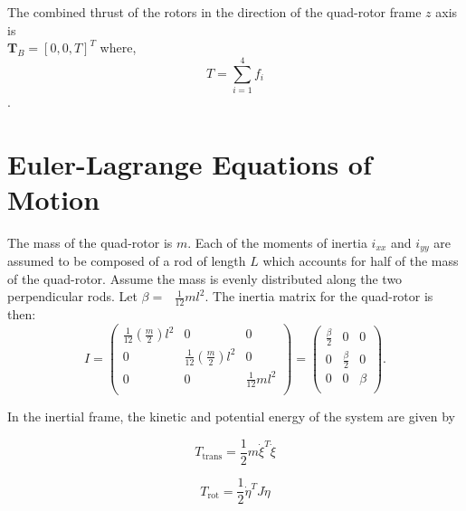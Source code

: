 The combined thrust of the rotors in the direction of the quad-rotor frame $z$ axis is\\

$\boldsymbol T_B = [0, 0, T]^T$ where,\\

\begin{equation}
    \label{totalThrust}
    T =  \displaystyle \sum \limits_{i=1}^4 f_i
\end{equation}.



\section{Euler-Lagrange Equations of Motion}


\noindent 
The mass of the quad-rotor is $m$. Each of the moments of inertia  $ i_{xx} $  and $ i_{yy} $
are assumed to be composed of a rod of length $ L $   which accounts for half of the mass of the quad-rotor. Assume the mass
is evenly distributed along the two perpendicular rods. Let  \(\beta  =\text{  }\frac{1}{12}m l^2 \). The inertia matrix for the quad-rotor is then: \\

\begin{equation}
I = \left(
\begin{array}{ccc}
 \frac{1}{12}\left(\frac{m}{2}\right)l^2 & 0 & 0 \\
 0 & \frac{1}{12}\left(\frac{m}{2}\right)l^2 & 0 \\
 0 & 0 & \frac{1}{12}m l^2 \\
\end{array}
\right) = \left(
\begin{array}{ccc}
 \frac{\beta }{2} & 0 & 0 \\
 0 & \frac{\beta }{2} & 0 \\
 0 & 0 & \beta  \\
\end{array}
\right).
\end{equation}

\noindent In the inertial frame, the kinetic and potential energy of the system are given by

\begin{equation}
    T_{\text{trans}}=\frac{1}{2}m\dot{\xi }^T\dot{\xi }
\end{equation}


\begin{equation}
    T_{\text{rot}}= \frac{1}{2}\dot{\eta }^T J \dot{\eta } 
\end{equation}


